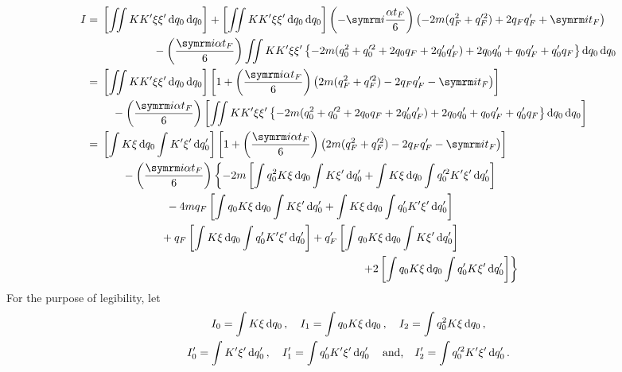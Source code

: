\begin{align}
    I &= \begin{multlined}[t]
        \left[\iint KK'\xi\xi'\dd{q_0}\dd{q_0}\right]
        + \left[\iint KK'\xi\xi'\dd{q_0}\dd{q_0}\right]\left(-\im\frac{\alpha t_F}{6}\right)\left(-2m(q_F^2 + q_F'^2) + 2q_Fq_F' + \im t_F\right) \\
        - \left(\frac{\im\alpha t_F}{6}\right)\iint KK'\xi\xi'\left\{-2m(q_0^2 + q_0'^2 + 2q_0q_F + 2q_0'q_F') + 2q_0q_0' + q_0q_F' + q_0'q_F\right\}\dd{q_0}\dd{q_0}
    \end{multlined} \nonumber \\
    &= \begin{multlined}[t]
        \left[\iint KK'\xi\xi'\dd{q_0}\dd{q_0}\right]\left[1 + \left(\frac{\im\alpha t_F}{6}\right)\left(2m(q_F^2 + q_F'^2) - 2q_Fq_F' - \im t_F\right)\right] \\
        - \left(\frac{\im\alpha t_F}{6}\right)\left[\iint KK'\xi\xi'\left\{-2m(q_0^2 + q_0'^2 + 2q_0q_F + 2q_0'q_F') + 2q_0q_0' + q_0q_F' + q_0'q_F\right\}\dd{q_0}\dd{q_0}\right]
    \end{multlined} \nonumber\\
    &= \begin{multlined}[t]
        \left[\int K\xi\dd{q_0}\int K'\xi'\dd{q_0'}\right]\left[1 + \left(\frac{\im\alpha t_F}{6}\right)\left(2m(q_F^2 + q_F'^2) - 2q_Fq_F' - \im t_F\right)\right] \\
        - \left(\frac{\im\alpha t_F}{6}\right) \left\{-2m\left[\int q_0^2K\xi\dd{q_0}\int K\xi'\dd{q_0'} + \int K\xi\dd{q_0}\int q_0'^2K'\xi'\dd{q_0'}\right] \right. \\
        -4mq_F\left[\int q_0K\xi\dd{q_0}\int K\xi'\dd{q_0'} + \int K\xi\dd{q_0}\int q_0'K'\xi'\dd{q_0'}\right] \\
        + q_F\left[\int K\xi\dd{q_0}\int q_0'K'\xi'\dd{q_0'}\right] + q_F'\left[\int q_0K\xi\dd{q_0}\int K\xi'\dd{q_0'}\right] \\ \left.
        + 2\left[\int q_0K\xi\dd{q_0}\int q_0'K\xi'\dd{q_0'}\right] \right\}
    \end{multlined}
\end{align}
For the purpose of legibility, let
\begin{multline}
    I_0 = \int K\xi\dd{q_0}, \quad I_1 = \int q_0K\xi\dd{q_0}, \quad I_2 = \int q_0^2K\xi\dd{q_0}, \\
    I_0' = \int K'\xi'\dd{q_0'}, \quad I_1' = \int q_0'K'\xi'\dd{q_0'} \quad\textrm{and,}\quad I_2' = \int q_0'^2K'\xi'\dd{q_0'}. \label{eq:integral_components_spring_jpd}
\end{multline}
